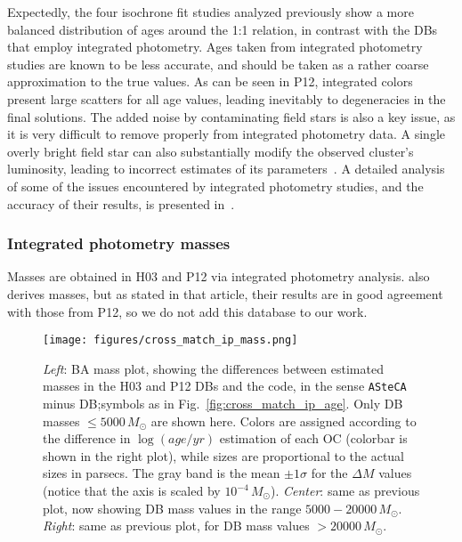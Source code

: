 \documentclass{aa}
\begin{document}
Expectedly, the four isochrone fit studies analyzed previously show a more
balanced distribution of ages around the 1:1 relation, in contrast with the DBs
that employ integrated photometry.
%
Ages taken from integrated photometry studies are known to be less
accurate, and should be taken as a rather coarse approximation to the true
values.
As can be seen in P12, integrated colors present large scatters for
all age values, leading inevitably to degeneracies in the final solutions.
The added noise by contaminating field stars is also a key issue, as it is
very difficult to remove properly from integrated photometry data. A
single overly bright field star can also substantially modify the observed
cluster's luminosity, leading to incorrect estimates of its
parameters~\citep{Baumgardt_2013,Piatti_2014_B88}.
A detailed analysis of some of the issues encountered by integrated photometry
studies, and the accuracy of their results, is presented
in~\cite{Anders_2013}.



\subsubsection{Integrated photometry masses}
\label{sssec:integ_photom_masses}
%
%
%
%
Masses are obtained in H03 and P12 via integrated photometry analysis.
\cite{Baumgardt_2013} also derives masses, but as stated in that article, their
results are in good agreement with those from P12, so we do not add this
database to our work.

\begin{figure*}
\texttt{[image: figures/cross\_match\_ip\_mass.png]}
\caption{\emph{Left}: BA mass plot, showing the differences between estimated
masses in the H03 and P12 DBs and the code, in the sense \texttt{ASteCA} minus
DB;\@ symbols as in Fig.~\ref{fig:cross_match_ip_age}.
Only DB masses ${\le}5000\,M_{\odot}$ are shown here.
Colors are assigned according to the difference in $\log(age/yr)$ estimation of
each OC (colorbar is shown in the right plot), while sizes are proportional to
the actual sizes in parsecs. The gray band is the mean $\pm 1\sigma$ for the
$\Delta M$ values (notice that the axis is scaled by $10^{-4}\,M_{\odot}$).
\emph{Center}: same as previous plot, now showing DB mass values in the range
$5000-20000\,M_{\odot}$.
\emph{Right}: same as previous plot, for DB mass values ${>}20000\,M_{\odot}$.
}
\label{fig:cross_match_ip_mass}
\end{figure*}
\end{document}
